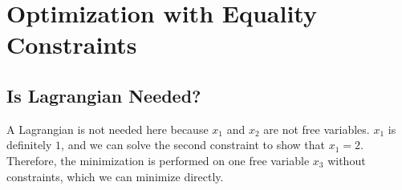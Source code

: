 \documentclass[11pt]{article}
\begin{document}
    \section{Optimization with Equality
Constraints}\label{optimization-with-equality-constraints}

    \subsection{Is Lagrangian Needed?}\label{is-lagrangian-needed}

    A Lagrangian is not needed here because \(x_1\) and \(x_2\) are not free
variables. \(x_1\) is definitely \(1\), and we can solve the second
constraint to show that \(x_1 = 2\). Therefore, the minimization is
performed on one free variable \(x_3\) without constraints, which we can
minimize directly.
\end{document}

